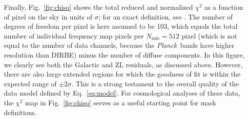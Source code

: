 \documentclass{aa}
\def\Planck{\textit{Planck}}
\begin{document}
Finally, Fig.~\ref{fig:chisq} shows the total reduced and normalized
$\chi^2$ as a function of pixel on the sky in units of $\sigma$; for
an exact definition, see \citet{bp10}. The number of degrees of
freedom per pixel is here assumed to be 103, which equals the total
number of individual frequency map pixels per $N_{\mathrm{side}}=512$
pixel (which is not equal to the number of data channels, because the
\Planck\ bands have higher resolution than DIRBE) minus the number of
diffuse components. In this figure, we clearly see both the Galactic
and ZL residuals, as discussed above. However, there are also large
extended regions for which the goodness of fit is within the expected
range of $\pm2\sigma$. This is a strong testament to the overall
quality of the data model defined by Eq.~\eqref{eq:model}. For
cosmological analyses of these data, the $\chi^2$ map in
Fig.~\ref{fig:chisq} serves as a useful starting point for mask
definitions. 









\end{document}
